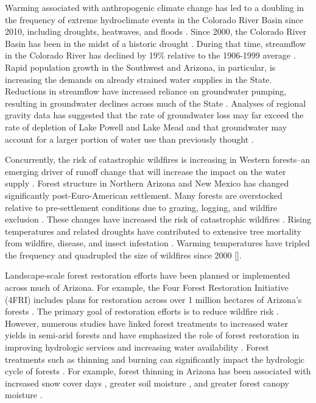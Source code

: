 \documentclass[
  number,
  preprint,
  3p,
  onecolumn]{elsarticle}
\begin{document}
Warming associated with anthropogenic climate change has led to a
doubling in the frequency of extreme hydroclimate events in the Colorado
River Basin since 2010, including droughts, heatwaves, and floods
\citep{bennett_concurrent_2021}. Since 2000, the Colorado River Basin
has been in the midst of a historic drought
\citep{meko_treering_2022, williams_rapid_2022}. During that time,
streamflow in the Colorado River has declined by 19\% relative to the
1906-1999 average \citep{hogan_recent_2024, udall_twentyfirst_2017}.
Rapid population growth in the Southwest and Arizona, in particular, is
increasing the demands on already strained water supplies in the State.
Reductions in streamflow have increased reliance on groundwater pumping,
resulting in groundwater declines across much of the State
\citep{tadych_historical_2024}. Analyses of regional gravity data has
suggested that the rate of groundwater loss may far exceed the rate of
depletion of Lake Powell and Lake Mead and that groundwater may account
for a larger portion of water use than previously thought
\citep{castle2014}.

Concurrently, the risk of catastrophic wildfires is increasing in
Western forests--an emerging driver of runoff change that will increase
the impact on the water supply \citep{williams_rapid_2022}. Forest
structure in Northern Arizona and New Mexico has changed significantly
post-Euro-American settlement. Many forests are overstocked relative to
pre-settlement conditions due to grazing, logging, and wildfire
exclusion \citep{covington_southwestern_1994, friederici2013}. These
changes have increased the risk of catastrophic wildfires
\citep{allen_ecological_2002}. Rising temperatures and related droughts
have contributed to extensive tree mortality from wildfire, disease, and
insect infestation \citep{berner_tree_2017}. Warming temperatures have
tripled the frequency and quadrupled the size of wildfires since 2000
{[}\citep{iglesias2022}{]}.

Landscape-scale forest restoration efforts have been planned or
implemented across much of Arizona. For example, the Four Forest
Restoration Initiative (4FRI) includes plans for restoration across over
1 million hectares of Arizona's forests
\citep{schultz_collaborative_2012}. The primary goal of restoration
efforts is to reduce wildfire risk
\citep{allen_ecological_2002, friederici2013}. However, numerous studies
have linked forest treatments to increased water yields in semi-arid
forests and have emphasized the role of forest restoration in improving
hydrologic services and increasing water availability
\citep{bosch_review_1982, baker_effects_1986, gottfried_moderate_1991, smerdon_overview_2009, zou_streamflow_2010, wyatt_estimating_2013, moreno_modeling_2015, simonit_impact_2015, wyatt_semiarid_2015, odonnell_forest_2018, schenk_impacts_2020, hibbert1979}.
Forest treatments such as thinning and burning can significantly impact
the hydrologic cycle of forests \citep{del_campo_global_2022}. For
example, forest thinning in Arizona has been associated with increased
snow cover days
\citep{sankey_multi-scale_2015, belmonte_uav-based_2021, donager_integrating_2021},
greater soil moisture \citep{belmonte_soil_2022, sankey_thinning_2022},
and greater forest canopy moisture \citep{sankey_regionalscale_2021}.
\end{document}
